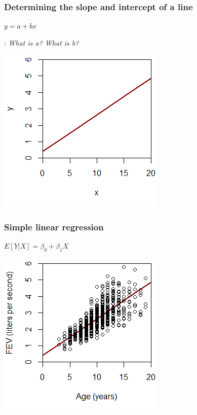 \documentclass[12pt, 
hyperref={colorlinks=true, linkcolor=blue, urlcolor=cyan}]{beamer}
\begin{document}
\begin{frame}
\frametitle{Determining the slope and intercept of a line}

\center
\begin{large} \color{red} $y = a + bx$ \end{large} \color{black}: \textit{What is a? What is b?}

\vspace{-0.2cm} \includegraphics{./plots/plot_y_vs_x} %

\end{frame}

\begin{frame}
\frametitle{Simple linear regression}

\center
\begin{large} \color{red} $E[Y|X] = \beta_0 + \beta_1 X$ \end{large} 

\vspace{-0.2cm} \includegraphics{./plots/plot_fev_vs_age}

\end{frame}
\end{document}
